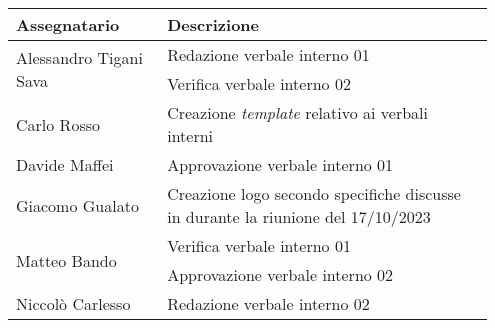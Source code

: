 \begin{center}
{
\renewcommand{\arraystretch}{1.5}
\begin{tabular}{p{0.30\linewidth}|p{0.65\linewidth}}
    \textbf{Assegnatario}    &   \textbf{Descrizione}  \\
    \hline
    \multirow{2}{*}{Alessandro Tigani Sava}  
							& Redazione verbale interno 01  \\
    \cline{2-2}
							& Verifica verbale interno 02                                   \\
    \hline
    Carlo Rosso             & Creazione \textit{template} relativo ai verbali interni       \\
    \hline
    Davide Maffei           
							& Approvazione verbale interno 01                               \\
    \hline
    Giacomo Gualato & Creazione logo secondo specifiche discusse in durante la riunione del 17/10/2023  \\
	\hline
    \multirow{2}{*}{Matteo Bando} & Verifica verbale interno 01                             \\
	\cline{2-2}
							& Approvazione verbale interno 02                               \\
    \hline
    Niccolò Carlesso        & Redazione verbale interno 02  \\
\end{tabular}
}
\end{center}
